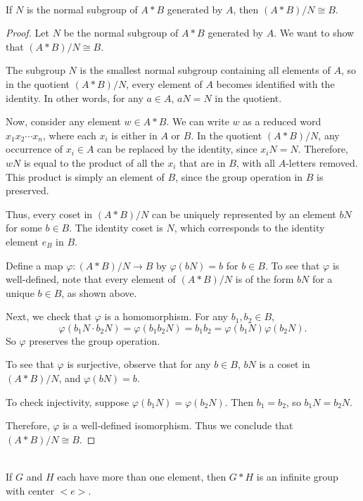 \documentclass{article}
\begin{document}
\begin{problem}[1.9.11] \\ 
    If $N$ is the normal subgroup of $A *B$ generated by $A$, then $(A * B)/N \cong B$.
\end{problem}

\begin{proof}
    Let $N$ be the normal subgroup of $A * B$ generated by $A$. We want to show that $(A * B)/N \cong B$.

    The subgroup $N$ is the smallest normal subgroup containing all elements of $A$, so in the quotient $(A * B)/N$, every element of $A$ becomes identified with the identity. In other words, for any $a \in A$, $a N = N$ in the quotient.

    Now, consider any element $w \in A * B$. We can write $w$ as a reduced word $x_1 x_2 \cdots x_n$, where each $x_i$ is either in $A$ or $B$. In the quotient $(A * B)/N$, any occurrence of $x_i \in A$ can be replaced by the identity, since $x_i N = N$. Therefore, $w N$ is equal to the product of all the $x_i$ that are in $B$, with all $A$-letters removed. This product is simply an element of $B$, since the group operation in $B$ is preserved.

    Thus, every coset in $(A * B)/N$ can be uniquely represented by an element $b N$ for some $b \in B$. The identity coset is $N$, which corresponds to the identity element $e_B$ in $B$.

    Define a map $\varphi : (A * B)/N \to B$ by $\varphi(b N) = b$ for $b \in B$. To see that $\varphi$ is well-defined, note that every element of $(A * B)/N$ is of the form $b N$ for a unique $b \in B$, as shown above.

    Next, we check that $\varphi$ is a homomorphism. For any $b_1, b_2 \in B$,
    \[
        \varphi(b_1 N \cdot b_2 N) = \varphi(b_1 b_2 N) = b_1 b_2 = \varphi(b_1 N)\varphi(b_2 N).
    \]
    So $\varphi$ preserves the group operation.

    To see that $\varphi$ is surjective, observe that for any $b \in B$, $b N$ is a coset in $(A * B)/N$, and $\varphi(b N) = b$.

    To check injectivity, suppose $\varphi(b_1 N) = \varphi(b_2 N)$. Then $b_1 = b_2$, so $b_1 N = b_2 N$.

    Therefore, $\varphi$ is a well-defined isomorphism. Thus we conclude that $(A * B)/N \cong B$.
\end{proof}


\begin{problem}[1.9.12] \\ 
    If $G$ and $H$ each have more than one element, then $G * H$ is an infinite group with center $<e>$.
\end{problem}
\end{document}
